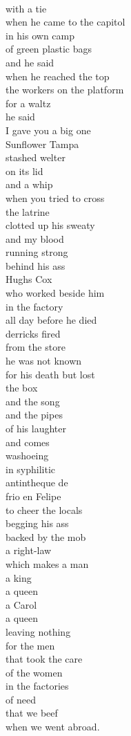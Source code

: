 \documentclass[smalldemyvopaper,11pt,twoside,onecolumn,openright,extrafontsizes]{memoir}
\begin{document}
\\with a tie
\\when he came to the capitol
\\in his own camp
\\of green plastic bags
\\and he said
\\when he reached the top
\\the workers on the platform
\\for a waltz
\\he said
\\I gave you a big one
\\Sunflower Tampa
\\stashed welter
\\on its lid
\\and a whip
\\when you tried to cross
\\the latrine
\\clotted up his sweaty
\\and my blood
\\running strong
\\behind his ass
\\Hughs Cox
\\who worked beside him
\\in the factory
\\all day before he died
\\derricks fired
\\from the store
\\he was not known
\\for his death but lost
\\the box
\\and the song
\\and the pipes
\\of his laughter
\\and comes
\\washoeing
\\in syphilitic
\\antintheque de
\\frio en Felipe
\\to cheer the locals
\\begging his ass
\\backed by the mob
\\a right-law
\\which makes a man
\\a king
\\a queen
\\a Carol
\\a queen
\\leaving nothing
\\for the men
\\that took the care
\\of the women
\\in the factories
\\of need
\\that we beef
\\when we went abroad.
\end{document}
